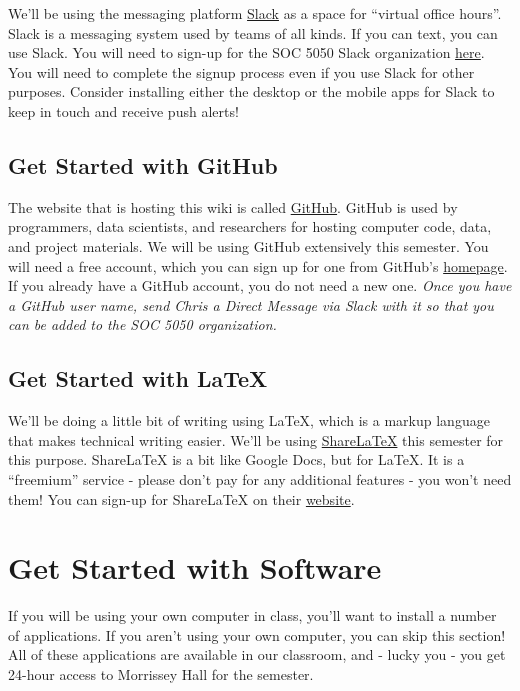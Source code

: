 \documentclass[]{book}
\theoremstyle{definition}
\theoremstyle{definition}
\theoremstyle{definition}
\theoremstyle{remark}
\begin{document}
We'll be using the messaging platform \href{https://slack.com}{Slack} as
a space for ``virtual office hours''. Slack is a messaging system used
by teams of all kinds. If you can text, you can use Slack. You will need
to sign-up for the SOC 5050 Slack organization
\href{https://join.slack.com/t/slu-soc5050/signup}{here}. You will need
to complete the signup process even if you use Slack for other purposes.
Consider installing either the desktop or the mobile apps for Slack to
keep in touch and receive push alerts!

\subsection{Get Started with GitHub}\label{get-started-with-github}

The website that is hosting this wiki is called
\href{https://github.com/}{GitHub}. GitHub is used by programmers, data
scientists, and researchers for hosting computer code, data, and project
materials. We will be using GitHub extensively this semester. You will
need a free account, which you can sign up for one from GitHub's
\href{https://github.com/}{homepage}. If you already have a GitHub
account, you do not need a new one. \emph{Once you have a GitHub user
name, send Chris a Direct Message via Slack with it so that you can be
added to the SOC 5050 organization.}

\subsection{Get Started with LaTeX}\label{get-started-with-latex}

We'll be doing a little bit of writing using LaTeX, which is a markup
language that makes technical writing easier. We'll be using
\href{https://www.sharelatex.com}{ShareLaTeX} this semester for this
purpose. ShareLaTeX is a bit like Google Docs, but for LaTeX. It is a
``freemium'' service - please don't pay for any additional features -
you won't need them! You can sign-up for ShareLaTeX on their
\href{https://www.sharelatex.com}{website}.

\section{Get Started with Software}\label{get-started-with-software}

If you will be using your own computer in class, you'll want to install
a number of applications. If you aren't using your own computer, you can
skip this section! All of these applications are available in our
classroom, and - lucky you - you get 24-hour access to Morrissey Hall
for the semester.
\end{document}
